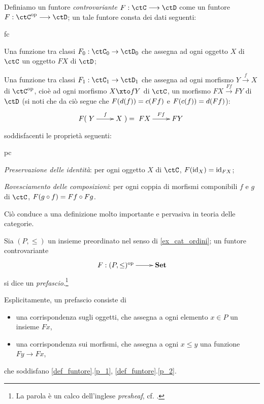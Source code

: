 \begin{definition}\label{def_funtore_contro}
	Definiamo un funtore \emph{controvariante} \(F : \ctC \fun\ctD\) come un funtore \(F : \ctC^\op\fun\ctD\); un tale funtore consta dei dati seguenti:
	\begin{enumtag}{fc}
		\item \label{fc_1} Una funzione tra classi \(F_0 : \ctC_0\to\ctD_0\) che assegna ad ogni oggetto \(X\) di \(\ctC\) un oggetto \(FX\) di \(\ctD\);
		\item \label{fc_2} Una funzione tra classi \(F_1 : \ctC_1\to\ctD_1\) che assegna ad ogni morfismo \(Y \xrightarrow{f} X\) di \(\ctC^\op\), cioè ad ogni morfismo \(X\xto f Y\) di \(\ctC\), un morfismo \(FX \xrightarrow{Ff} FY\) di \(\ctD\) (si noti che da ciò segue che \(F(d(f))=c(Ff)\) e \(F(c(f))=d(Ff)\)):
		\[F(\xymatrix{Y \ar[r]^f & X}) = \xymatrix{FX \ar[r]^{Ff} & FY}\]
	\end{enumtag}
	soddisfacenti le proprietà seguenti:
	\begin{enumtag}{pc}
		\item \label{pc_1} \emph{Preservazione delle identità}: per ogni oggetto \(X\) di \(\ctC\), \(F(\mathrm{id}_X)=\mathrm{id}_{FX}\);
		\item \label{pc_2} \emph{Rovesciamento delle composizioni}: per ogni coppia di morfismi componibili \(f\) e \(g\) di \(\ctC\), \(F(g\circ f)=Ff\circ Fg\).
	\end{enumtag}
\end{definition}
Ciò conduce a una definizione molto importante e pervasiva in teoria delle categorie.
\begin{definition}\label{exa_funtori_da_poset}
	Sia \((P,\le)\) un insieme preordinato nel senso di \ref{ex_cat_ordini}; un funtore controvariante
	\[\xymatrix{F : (P,\le)^\op \ar[r] & \ctSet}\]
	si dice un \emph{prefascio}.\footnote{La parola è un calco dell'inglese \emph{presheaf}, cf. \cite{a,b,c}.}

	Esplicitamente, un prefascio consiste di
	\begin{itemize}
		\item una corrispondenza sugli oggetti, che assegna a ogni elemento \(x\in P\) un insieme \(Fx\),
		\item una corrispondenza sui morfismi, che assegna a ogni \(x\le y\) una funzione \(Fy\to Fx\),
	\end{itemize}
	che soddisfano \ref{def_funtore}.\ref{p_1}, \ref{def_funtore}.\ref{p_2}.
\end{definition}
